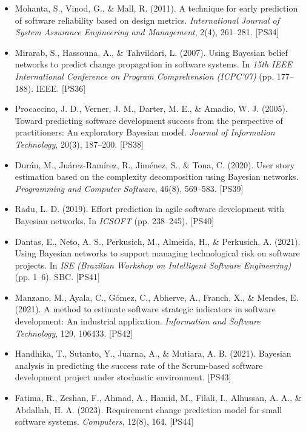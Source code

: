 \begin{itemize}
\item Mohanta, S., Vinod, G., \& Mall, R. (2011).
A technique for early prediction of software reliability based on design metrics.
\textit{International Journal of System Assurance Engineering and Management}, 2(4), 261--281. [PS34]

\item Mirarab, S., Hassouna, A., \& Tahvildari, L. (2007).
Using Bayesian belief networks to predict change propagation in software systems.
In \textit{15th IEEE International Conference on Program Comprehension (ICPC'07)} (pp. 177--188). IEEE. [PS36]

\item Procaccino, J. D., Verner, J. M., Darter, M. E., \& Amadio, W. J. (2005).
Toward predicting software development success from the perspective of practitioners: An exploratory Bayesian model.
\textit{Journal of Information Technology}, 20(3), 187--200. [PS38]

\item Durán, M., Juárez-Ramírez, R., Jiménez, S., \& Tona, C. (2020).
User story estimation based on the complexity decomposition using Bayesian networks.
\textit{Programming and Computer Software}, 46(8), 569--583. [PS39]

\item Radu, L. D. (2019).
Effort prediction in agile software development with Bayesian networks.
In \textit{ICSOFT} (pp. 238--245). [PS40]

\item Dantas, E., Neto, A. S., Perkusich, M., Almeida, H., \& Perkusich, A. (2021).
Using Bayesian networks to support managing technological risk on software projects.
In \textit{ISE (Brazilian Workshop on Intelligent Software Engineering)} (pp. 1--6). SBC. [PS41]

\item Manzano, M., Ayala, C., Gómez, C., Abherve, A., Franch, X., \& Mendes, E. (2021).
A method to estimate software strategic indicators in software development: An industrial application.
\textit{Information and Software Technology}, 129, 106433. [PS42]

\item Handhika, T., Sutanto, Y., Juarna, A., \& Mutiara, A. B. (2021).
Bayesian analysis in predicting the success rate of the Scrum-based software development project under stochastic environment. [PS43]

\item Fatima, R., Zeshan, F., Ahmad, A., Hamid, M., Filali, I., Alhussan, A. A., \& Abdallah, H. A. (2023).
Requirement change prediction model for small software systems.
\textit{Computers}, 12(8), 164. [PS44]


\end{itemize}
